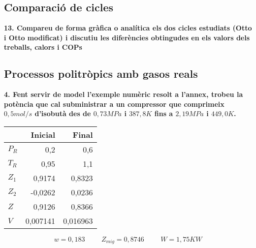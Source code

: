\documentclass[a4paper]{article}
\begin{document}
\subsection*{Comparació de cicles}	

\textbf{13. Compareu de forma gràfica o analítica els dos cicles estudiats (Otto i Otto modificat) i discutiu les diferències obtingudes en els valors dels treballs, calors i COPs}

\subsection*{Processos politròpics amb gasos reals}

\textbf{4. Fent servir de model l’exemple numèric resolt a l’annex, trobeu la potència que cal subministrar a un compressor que comprimeix $0,5 mol/s$ d’isobutà des de $0,73 MPa$ i $387,8 K$ fins a $2,19 MPa$ i $449,0 K$.}

\begin{center}
	\begin{tabular}{l|rr}
		& Inicial & Final \\
		\hline
		$P_R$ & 0,2 & 0,6 \\
		$T_R$ & 0,95 & 1,1 \\
		$Z_1$ & 0,9174 & 0,8323 \\
		$Z_2$ & -0,0262 & 0,0236 \\
		$Z$ & 0,9126 & 0,8366 \\
		$V$ & 0,007141 & 0,016963 \\
	\end{tabular}
\end{center}

$$ w = 0,183 \hspace{1cm} Z_{mig} = 0,8746 \hspace{1cm} W = 1,75KW $$
\end{document}
